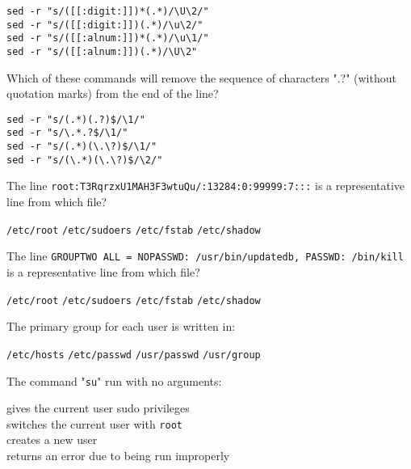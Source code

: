 \documentclass[a4paper,11pt]{exam}
\newcommand{\shell}[1]{\texttt{#1}}
\begin{document}
\begin{questions}
	\begin{oneparchoices}
		\CorrectChoice \verb|sed -r "s/([[:digit:]])*(.*)/\U\2/"| \\ 
		\choice \verb|sed -r "s/([[:digit:]])(.*)/\u\2/"|  \\
		\choice \verb|sed -r "s/([[:alnum:]])*(.*)/\u\1/"| \\
		\choice \verb|sed -r "s/([[:alnum:]])(.*)/\U\2"| 
	\end{oneparchoices}


  \question
  Which of these commands will remove the sequence of characters ".?" (without quotation marks) from the end of the line? 

		\begin{oneparchoices}
		\choice \verb|sed -r "s/(.*)(.?)$/\1/"|  \\
		\choice \verb|sed -r "s/\.*.?$/\1/"| \\
    \CorrectChoice \verb|sed -r "s/(.*)(\.\?)$/\1/"| \\ 
    \choice \verb|sed -r "s/(\.*)(\.\?)$/\2/"|
	\end{oneparchoices}

	
		\question
	The line \shell{root:T3RqrzxU1MAH3F3wtuQu/:13284:0:99999:7:::} is a representative line from which file?
	
	\begin{oneparchoices}
		\choice \shell{/etc/root} 
		\choice \shell{/etc/sudoers} 
		\choice \shell{/etc/fstab} 
		\CorrectChoice \shell{/etc/shadow}
  \end{oneparchoices}

		\question
	The line \shell{GROUPTWO    ALL = NOPASSWD: /usr/bin/updatedb, PASSWD: /bin/kill} is a representative line from which file?
	
	\begin{oneparchoices}
		\choice \shell{/etc/root} 
		\CorrectChoice \shell{/etc/sudoers} 
		\choice \shell{/etc/fstab} 
		\choice \shell{/etc/shadow}
  \end{oneparchoices}


	\question
	The primary group for each user is written in:

	\begin{oneparchoices}
   	\choice \shell{/etc/hosts}
		\CorrectChoice \shell{/etc/passwd}
		\choice \shell{/usr/passwd} 
		\choice \shell{/usr/group}  
	\end{oneparchoices}

	\question
  The command "\shell{su}" run with no arguments:
	
	\begin{oneparchoices}
		\choice gives the current user sudo privileges \\
		\CorrectChoice switches the current user with \shell{root} \\ 
		\choice creates a new user \\
		\choice returns an error due to being run improperly
	\end{oneparchoices}
	

\end{questions}
\end{document}
